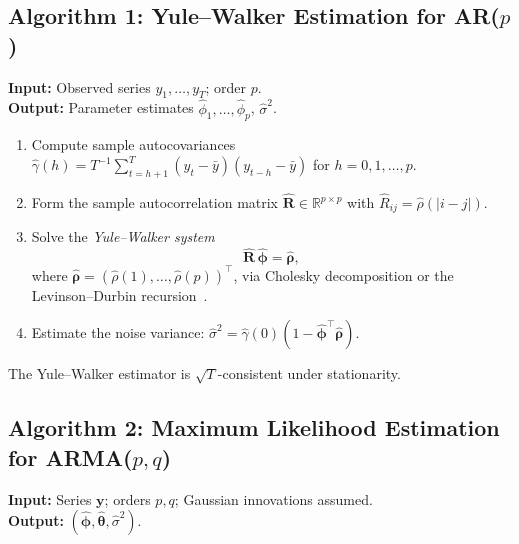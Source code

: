 \documentclass[conference]{IEEEtran}
\theoremstyle{definition}
\begin{document}
\subsection{Algorithm 1: Yule--Walker Estimation for AR($p$)}

\noindent\textbf{Input:} Observed series $y_1,\ldots,y_T$; order $p$.\\
\noindent\textbf{Output:} Parameter estimates $\hat{\phi}_1,\ldots,\hat{\phi}_p$,
$\hat{\sigma}^2$.

\begin{enumerate}
  \item Compute sample autocovariances
        $\hat{\gamma}(h) = T^{-1}\sum_{t=h+1}^T (y_t-\bar{y})(y_{t-h}-\bar{y})$
        for $h = 0, 1, \ldots, p$.
  \item Form the sample autocorrelation matrix
        $\hat{\mathbf{R}} \in \mathbb{R}^{p\times p}$ with
        $\hat{R}_{ij} = \hat{\rho}(|i-j|)$.
  \item Solve the \emph{Yule--Walker system}
        \begin{equation}
          \hat{\mathbf{R}}\,\hat{\boldsymbol{\phi}}
          = \hat{\boldsymbol{\rho}},
          \label{eq:yw_matrix}
        \end{equation}
        where $\hat{\boldsymbol{\rho}} = (\hat{\rho}(1),\ldots,\hat{\rho}(p))^{\top}$,
        via Cholesky decomposition or the Levinson--Durbin recursion~\cite{durbin1960fitting}.
  \item Estimate the noise variance:
        $\hat{\sigma}^2 = \hat{\gamma}(0)(1 - \hat{\boldsymbol{\phi}}^{\top}
        \hat{\boldsymbol{\rho}})$.
\end{enumerate}

The Yule--Walker estimator is $\sqrt{T}$-consistent under stationarity.

\subsection{Algorithm 2: Maximum Likelihood Estimation for ARMA($p,q$)}

\noindent\textbf{Input:} Series $\mathbf{y}$; orders $p,q$;
Gaussian innovations assumed.\\
\noindent\textbf{Output:} $(\hat{\boldsymbol{\phi}}, \hat{\boldsymbol{\theta}}, \hat{\sigma}^2)$.
\end{document}
